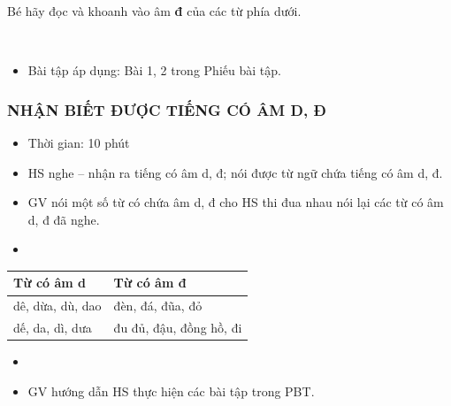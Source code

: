 \documentclass[../main.tex]{subfiles}
\begin{document}
\begin{bt}
    Bé hãy đọc và khoanh vào âm \textbf{đ} của các từ phía dưới.
    \TTbatdauhinh
    {\centering
        \hfill
        \begin{minipage}[b]{0.42\linewidth}\centering{}\\[8pt]\end{minipage}\par}
\end{bt}

\newpage

\begin{itemize}\GAgon
    \item Bài tập áp dụng: Bài 1, 2 trong Phiếu bài tập.
\end{itemize}

\subsubsection{NHẬN BIẾT ĐƯỢC TIẾNG CÓ ÂM D, Đ}
\begin{hd}
    \begin{itemize}\GAgon
        \item Thời gian: 10 phút
        \item HS nghe -- nhận ra tiếng có âm d, đ; nói được từ ngữ chứa tiếng có âm d, đ.
    \end{itemize}
\end{hd}
\begin{itemize}\GAgon
    \item GV nói một số từ có chứa âm d, đ cho HS thi đua nhau nói lại các từ có âm d, đ đã nghe.
    \item {}
\end{itemize}
{\centering
    \renewcommand{\arraystretch}{1.45}
    \begin{tabular}{|>{\centering\arraybackslash}p{6.5cm}|>{\centering\arraybackslash}p{6.5cm}|}
        \hline
        \textbf{Từ có âm d} & \textbf{Từ có âm đ}\\
        \hline
        dê, dừa, dù, dao & đèn, đá, đũa, đỏ\\
        \hline
        dế, da, dì, dưa & đu đủ, đậu, đồng hồ, đi\\
        \hline
    \end{tabular}\par}
\begin{itemize}\GAgon
    \item {}
    \item GV hướng dẫn HS thực hiện các bài tập trong PBT.
\end{itemize}
\end{document}
